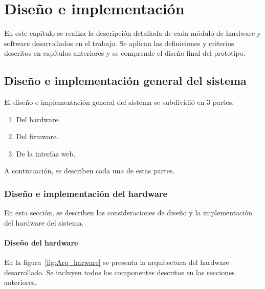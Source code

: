 \chapter{Diseño e implementación} %

\label{Chapter3} %


En este capítulo se realiza la descripción detallada de cada módulo de hardware y software desarrollados en el trabajo. Se aplican las definiciones y criterios descritos en capítulos anteriores y se comprende el diseño final del prototipo.

\section{Diseño e implementación general del sistema}

El diseño e implementación general del sistema se subdividió en 3 partes: 

\begin{enumerate}
    \item Del hardware.
    \item Del firmware.
    \item De la interfaz web.
\end{enumerate}

A continuación, se describen cada una de estas partes.

\subsection{Diseño e implementación del hardware}
\label{sec:dis_impl_hardware}

En esta sección, se describen las consideraciones de diseño y la implementación del hardware del sistema. 

\subsubsection{Diseño del hardware}

En la figura~\ref{fig:Arq_harware} se presenta la arquitectura del hardware desarrollado. Se incluyen todos los componentes descritos en las secciones anteriores. 

